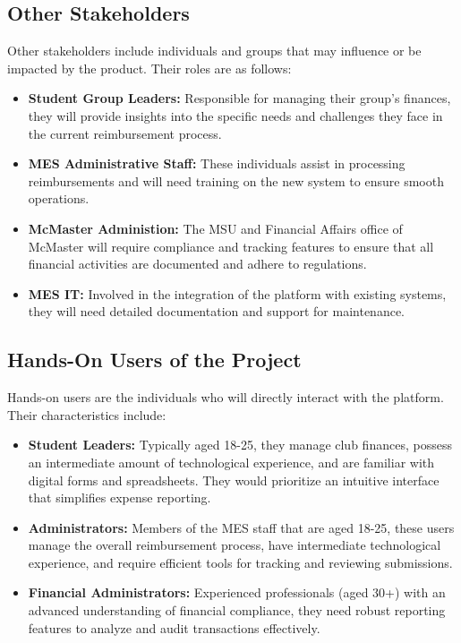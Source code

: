 \documentclass[12pt]{article}
\begin{document}
\subsection{Other Stakeholders}
Other stakeholders include individuals and groups that may influence or be impacted by the product. Their roles are as follows:
\begin{itemize}
    \item \textbf{Student Group Leaders:} Responsible for managing their group's finances, they will provide insights into the specific needs and challenges they face in the current reimbursement process.
    \item \textbf{MES Administrative Staff:} These individuals assist in processing reimbursements and will need training on the new system to ensure smooth operations.
    \item \textbf{McMaster Administion:} The MSU and Financial Affairs office of McMaster will require compliance and tracking features to ensure that all financial activities are documented and adhere to regulations.
    \item \textbf{MES IT:} Involved in the integration of the platform with existing systems, they will need detailed documentation and support for maintenance.
\end{itemize}

\subsection{Hands-On Users of the Project}
Hands-on users are the individuals who will directly interact with the platform. Their characteristics include:
\begin{itemize}
    \item \textbf{Student Leaders:} Typically aged 18-25, they manage club finances, possess an intermediate amount of technological experience, and are familiar with digital forms and spreadsheets. They would prioritize an intuitive interface that simplifies expense reporting.
    \item \textbf{Administrators:} Members of the MES staff that are aged 18-25, these users manage the overall reimbursement process, have intermediate technological experience, and require efficient tools for tracking and reviewing submissions.
    \item \textbf{Financial Administrators:} Experienced professionals (aged 30+) with an advanced understanding of financial compliance, they need robust reporting features to analyze and audit transactions effectively.
\end{itemize}
\end{document}
